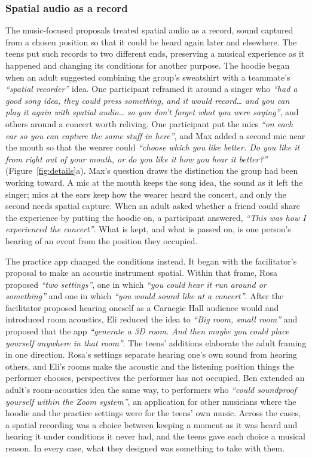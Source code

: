 \subsubsection{Spatial audio as a record}

The music-focused proposals treated spatial audio as a record, sound captured from a chosen position so that it could be heard again later and elsewhere. The teens put such records to two different ends, preserving a musical experience as it happened and changing its conditions for another purpose. The hoodie began when an adult suggested combining the group's sweatshirt with a teammate's \textit{``spatial recorder''} idea. One participant reframed it around a singer who \textit{``had a good song idea, they could press something, and it would record\ldots{} and you can play it again with spatial audio\ldots{} so you don't forget what you were saying''}, and others around a concert worth reliving. One participant put the mics \textit{``on each ear so you can capture the same stuff in here''}, and Max added a second mic near the mouth so that the wearer could \textit{``choose which you like better. Do you like it from right out of your mouth, or do you like it how you hear it better?''} (Figure~\ref{fig:details}a). Max's question draws the distinction the group had been working toward. A mic at the mouth keeps the song idea, the sound as it left the singer; mics at the ears keep how the wearer heard the concert, and only the second needs spatial capture. When an adult asked whether a friend could share the experience by putting the hoodie on, a participant answered, \textit{``This was how I experienced the concert''}. What is kept, and what is passed on, is one person's hearing of an event from the position they occupied.

The practice app changed the conditions instead. It began with the facilitator's proposal to make an acoustic instrument spatial. Within that frame, Rosa proposed \textit{``two settings''}, one in which \textit{``you could hear it run around or something''} and one in which \textit{``you would sound like at a concert''}. After the facilitator proposed hearing oneself as a Carnegie Hall audience would and introduced room acoustics, Eli reduced the idea to \textit{``Big room, small room''} and proposed that the app \textit{``generate a 3D room. And then maybe you could place yourself anywhere in that room''}. The teens' additions elaborate the adult framing in one direction. Rosa's settings separate hearing one's own sound from hearing others, and Eli's rooms make the acoustic and the listening position things the performer chooses, perspectives the performer has not occupied. Ben extended an adult's room-acoustics idea the same way, to performers who \textit{``could soundproof yourself within the Zoom system''}, an application for other musicians where the hoodie and the practice settings were for the teens' own music. Across the cases, a spatial recording was a choice between keeping a moment as it was heard and hearing it under conditions it never had, and the teens gave each choice a musical reason. In every case, what they designed was something to take with them.

